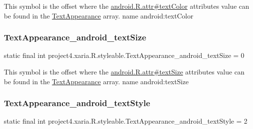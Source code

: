 This symbol is the offset where the \hyperlink{}{android.\+R.\+attr\#text\+Color} attribute\textquotesingle{}s value can be found in the \hyperlink{classproject4_1_1xaria_1_1R_1_1styleable_a324a4bda63d9f00d154e0a6c1eb718b0}{Text\+Appearance} array.  name android\+:text\+Color \mbox{\label{classproject4_1_1xaria_1_1R_1_1styleable_aee9f72e6edb60f105b97642812464a80}} 
\subsubsection{\texorpdfstring{Text\+Appearance\+\_\+android\+\_\+text\+Size}{TextAppearance\_android\_textSize}}
{\footnotesize\ttfamily static final int project4.\+xaria.\+R.\+styleable.\+Text\+Appearance\+\_\+android\+\_\+text\+Size = 0\hspace{0.3cm}{\ttfamily [static]}}

This symbol is the offset where the \hyperlink{}{android.\+R.\+attr\#text\+Size} attribute\textquotesingle{}s value can be found in the \hyperlink{classproject4_1_1xaria_1_1R_1_1styleable_a324a4bda63d9f00d154e0a6c1eb718b0}{Text\+Appearance} array.  name android\+:text\+Size \mbox{\label{classproject4_1_1xaria_1_1R_1_1styleable_aa7aadad2b1e03de56ffff6233004edd3}} 
\subsubsection{\texorpdfstring{Text\+Appearance\+\_\+android\+\_\+text\+Style}{TextAppearance\_android\_textStyle}}
{\footnotesize\ttfamily static final int project4.\+xaria.\+R.\+styleable.\+Text\+Appearance\+\_\+android\+\_\+text\+Style = 2\hspace{0.3cm}{\ttfamily [static]}}

